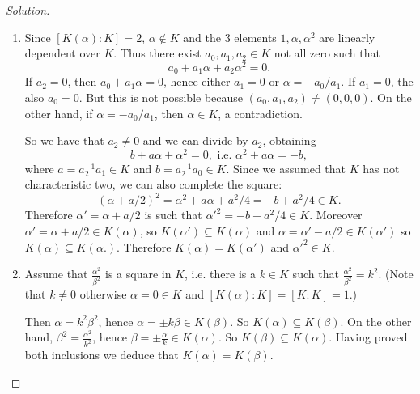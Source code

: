 \documentclass[a4paper,10pt,reqno]{amsart}
\newenvironment{sol}
  {\renewcommand\qedsymbol{$\blacksquare$}\begin{proof}[Solution]}
  {\end{proof}}
\begin{document}
\begin{sol}~
    \begin{enumerate}[label=(\roman*)]
        \item Since $[K(\alpha):K]=2$, $\alpha\not\in K$ and the 3 
        elements $1,\alpha,\alpha^2$ are linearly dependent over $K$.
        Thus there exist $a_0,a_1,a_2\in K$ not all zero such that 
        \[
        a_0+a_1\alpha+a_2\alpha^2=0.
        \]
        If $a_2=0$, then $a_0+a_1\alpha=0$, hence either $a_1=0$ or 
        $\alpha=-a_0/a_1$. 
        If $a_1=0$, the also $a_0=0$. But this is not possible 
        because $(a_0,a_1,a_2)\neq (0,0,0)$.
        On the other hand, if $\alpha=-a_0/a_1$, then $\alpha\in K$, a contradiction.

        So we have that $a_2\neq 0$ and we can divide by $a_2$,
        obtaining
        \[        b+a\alpha+\alpha^2=0, \text{ i.e. } \alpha^2+a\alpha=-b,
        \]
        where $a=a_2^{-1}a_1\in K$ and $b=a_2^{-1}a_0\in K$. 
        Since we assumed that $K$ has not characteristic two,
        we can also complete the square:
        \[
        (\alpha+a/2)^2=\alpha^2+a\alpha+a^2/4=-b+a^2/4\in K.
        \]
        Therefore $\alpha'=\alpha+a/2$
        is such that $\alpha'^2=-b+a^2/4\in K$.
        Moreover $\alpha'=\alpha+a/2\in K(\alpha)$, so $K(\alpha')\subseteq K(\alpha)$ and $\alpha=\alpha'-a/2\in K(\alpha')$ so $K(\alpha)\subseteq K(\alpha.)$. Therefore $K(\alpha)=K(\alpha')$ and $\alpha'^2\in K$.
        \item Assume that $\frac{\alpha^2}{\beta^2}$ is a square in $K$,
        i.e. there is a $k\in K$ such that
        $\frac{\alpha^2}{\beta^2}=k^2$.
        (Note that $k\neq 0$ otherwise $\alpha=0\in K$
        and $[K(\alpha):K]=[K:K]=1$.)

        Then $\alpha=k^2\beta^2$, hence $\alpha=\pm k\beta\in K(\beta)$. So $K(\alpha)\subseteq K(\beta)$.
        On the other hand, $\beta^2=\frac{\alpha^2}{k^2}$, hence $\beta=\pm \frac{\alpha}{k}\in K(\alpha)$. So $K(\beta)\subseteq K(\alpha)$.
        Having proved both inclusions we deduce that 
        $K(\alpha)=K(\beta)$.


\end{enumerate}
\end{sol}
\end{document}
